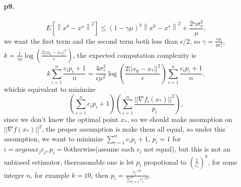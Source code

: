 \documentclass[8pt,a4paper]{article}
\begin{document}
\paragraph{p9.}
\begin{equation}
	E\left[\left\|x^{k}-x^{\star}\right\|^{2}\right] \leq(1-\gamma \mu)^{k}\left\|x^{0}-x^{\star}\right\|^{2}+\frac{2 \gamma \sigma_{\star}^{2}}{\mu},
\end{equation}
we want the first term and the second term both less than $\epsilon/2$, so 
$\gamma = \frac{\epsilon \mu}{4\sigma_{*}^2}$, $k=\frac{1}{\gamma\mu}\log(\frac{2||x_0-x_*||^2}{\epsilon})$, the expected computation complexity is $$k\sum_{i=1}^n\frac{c_ip_i+1}{n}=\frac{4\sigma_{*}^2}{\epsilon\mu^2}\log(\frac{2||x_0-x_*||^2}{\epsilon})\sum_{i=1}^n\frac{c_ip_i+1}{n},$$
	whichis equivalent to minimize 
	\begin{equation*}
		(\sum_{i=1}^n c_ip_i+1)(\sum_{i=1}^n\frac{||\nabla f_i(x_*)||^2}{p_i}),
	\end{equation*}
	since we don't know the optimal point $x_*$, so we should make assumption on $||\nabla f(x_*)||^2$, the proper assumption is make them all equal, so under this assumption, we want to minimize $\sum_{i=1}^nc_ip_i+1$, $p_i=1$ for $i=argmax_j c_j, p_i=0 \text{otherwise}$(assume each $c_i$ not equal), but this is not an unbiased estimator, thereasonable one is let $p_i$ propotional to $(\frac{1}{c_i})^k$, for some integer $n$, for example $k=10$, then $p_i=\frac{c_i^{-10}}{\sum_{i=1}^nc_i^{-10}}$.
	
\end{document}
